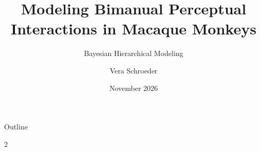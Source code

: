 \documentclass[aspectratio=169,11pt]{beamer}
\title{Modeling Bimanual Perceptual Interactions in Macaque Monkeys}
\subtitle{Bayesian Hierarchical Modeling}
\author{Vera Schroeder}
\date{November 2026}
\begin{document}
\begin{frame}
  \titlepage
\end{frame}

\begin{frame}{Outline}
  \small
  \begin{multicols}{2}
    \tableofcontents
  \end{multicols}
\end{frame}








\appendix
\end{document}
